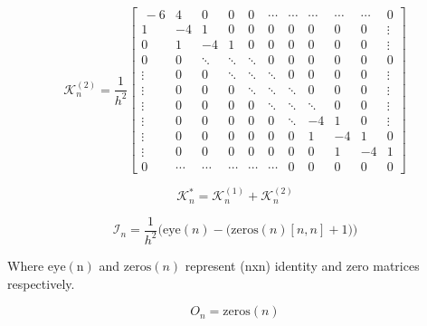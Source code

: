 \[
    \mathcal{K}_n^{(2)}  = 
\frac{1}{h^2}
\begin{bmatrix} \,
-6 & 4 & 0 & 0& 0 & \cdots & \cdots & \cdots & \cdots & \cdots & 0 \\
1 & -4 & 1 & 0 & 0 & 0 & 0 & 0 & 0 & 0 & \vdots \\
0 & 1 & -4 & 1 & 0 & 0 & 0 & 0 & 0 & 0 & \vdots \\
0 & 0 & \ddots & \ddots & \ddots & 0 & 0 & 0 & 0 & 0 & 0 \\
\vdots & 0  & 0  & \ddots & \ddots & \ddots & 0 & 0 & 0 & 0  & \vdots \\
\vdots & 0  & 0  & 0  & \ddots & \ddots & \ddots & 0 & 0 & 0 & \vdots \\
\vdots & 0  & 0  & 0 & 0 & \ddots & \ddots & \ddots & 0 & 0  & \vdots \\
\vdots & 0  & 0  & 0 & 0 & 0 & \ddots & -4 & 1 & 0  & \vdots\\
\vdots & 0  & 0  & 0 & 0 & 0 & 0 & 1 & -4  & 1 & 0\\
\vdots & 0 & 0 & 0 & 0 & 0 & 0 & 0 & 1 & -4 & 1\\
0      & \cdots & \cdots & \cdots & \cdots & \cdots & 0 & 0 & 0 & 0 & 0 
\end{bmatrix}
\]

\[
	\mathcal{K}_n^{*} = \mathcal{K}_n^{(1)} + \mathcal{K}_n^{(2)} 
\]

\[
    \mathcal{I}_n = \frac{1}{h^2} \bigg( \mathrm{eye}(n) - \big( \mathrm{zeros}(n)[n,n] + 1 \big) \bigg)
\]

Where $\mathrm{eye}(\mathrm{n})$ and $\mathrm{zeros}({n})$ represent (nxn) identity and zero matrices respectively.

\[ 
	O_{n} = \mathrm{zeros}(n)
\]	
\fi
\newpage

